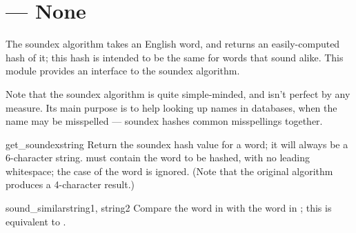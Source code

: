 \section{ ---
         None}




The soundex algorithm takes an English word, and returns an
easily-computed hash of it; this hash is intended to be the same for
words that sound alike.  This module provides an interface to the
soundex algorithm.

Note that the soundex algorithm is quite simple-minded, and isn't
perfect by any measure.  Its main purpose is to help looking up names
in databases, when the name may be misspelled --- soundex hashes common
misspellings together.

\begin{funcdesc}{get_soundex}{string}
Return the soundex hash value for a word; it will always be a
6-character string.   must contain the word to be hashed,
with no leading whitespace; the case of the word is ignored.  (Note
that the original algorithm produces a 4-character result.)
\end{funcdesc}

\begin{funcdesc}{sound_similar}{string1, string2}
Compare the word in  with the word in ; this
is equivalent to 
 \code{==}
.
\end{funcdesc}


\begin{seealso}
\end{seealso}

